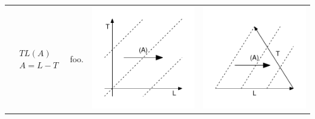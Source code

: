 \documentclass[
  12pt
]{scrartcl}
\begin{document}
\begin{center}
\begin{longtable}{m{}m{}m{}m{}}
  \midrule
  $$\begin{aligned}
    &TL(A) \\
    &A = L - T
  \end{aligned}$$ &
  foo. &
  \includegraphics[width = \linewidth]{../fig/TLa.pdf} &
  \includegraphics[width = \linewidth]{../fig/TLa_iso.pdf}  \\

\end{longtable}
\end{center}
\end{document}
